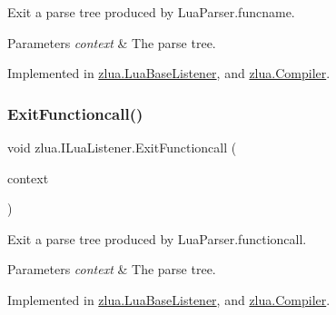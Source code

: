 Exit a parse tree produced by Lua\+Parser.\+funcname. 


\begin{DoxyParams}{Parameters}
{\em context} & The parse tree.\\
\hline
\end{DoxyParams}


Implemented in \mbox{\hyperlink{classzlua_1_1_lua_base_listener_a843fca537940a8a34507118ef087212b}{zlua.\+Lua\+Base\+Listener}}, and \mbox{\hyperlink{classzlua_1_1_compiler_adc2ed4db7299eb84e5a16cdbcda257d4}{zlua.\+Compiler}}.

\mbox{\label{interfacezlua_1_1_i_lua_listener_acd0b2537f173e36443c60445ef23eeb6}} 
\subsubsection{\texorpdfstring{Exit\+Functioncall()}{ExitFunctioncall()}}
{\footnotesize\ttfamily void zlua.\+I\+Lua\+Listener.\+Exit\+Functioncall (\begin{DoxyParamCaption}\item[{\mbox{[}\+Not\+Null\mbox{]} \mbox{\hyperlink{classzlua_1_1_lua_parser_1_1_functioncall_context}{Lua\+Parser.\+Functioncall\+Context}}}]{context }\end{DoxyParamCaption})}



Exit a parse tree produced by Lua\+Parser.\+functioncall. 


\begin{DoxyParams}{Parameters}
{\em context} & The parse tree.\\
\hline
\end{DoxyParams}


Implemented in \mbox{\hyperlink{classzlua_1_1_lua_base_listener_ac08101b052d2965f37939320ba03e792}{zlua.\+Lua\+Base\+Listener}}, and \mbox{\hyperlink{classzlua_1_1_compiler_add5efa354ab9c4c04eb03d835b697acc}{zlua.\+Compiler}}.

\mbox{\label{interfacezlua_1_1_i_lua_listener_a61203f381bc56ad4df13efd83138aeec}} 

